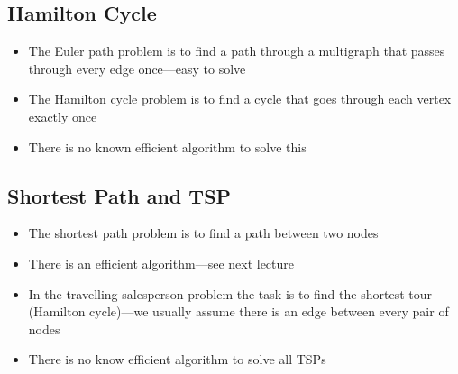 \Outline %

\begin{slide}
\section[-2]{Hamilton Cycle}

\pausebuild
\color{TwoColor}
\begin{itemize}\squeeze
\item The Euler path problem is to find a path through a multigraph
  that passes through every edge once---easy to solve\pauseh
\item The Hamilton cycle problem is to find a cycle that goes through
  each vertex exactly once\pauseh
  \begin{center}\color{TextColor}
    \pause
  \end{center}\color{TwoColor}
\item There is no known efficient algorithm to solve this\pauseh
\end{itemize}

\end{slide}


\begin{slide}
\section{Shortest Path and TSP}

\begin{PauseHighLight}
  \begin{itemize}
  \item The shortest path problem is to find a path between two
    nodes\pause
  \item There is an efficient algorithm---see next lecture\pause
  \item In the travelling salesperson problem the task is to find the
    shortest tour (Hamilton cycle)---we usually assume there is an edge
    between every pair of nodes\pause
  \item There is no know efficient algorithm to solve all TSPs\pause
  \end{itemize}
\end{PauseHighLight}

\end{slide}

